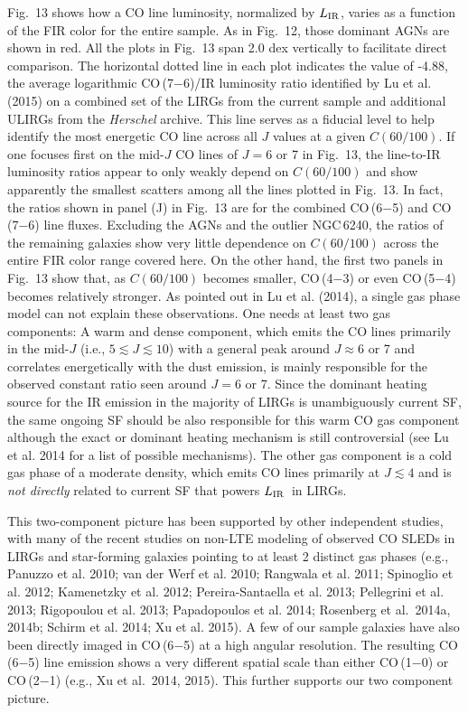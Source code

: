 \documentclass[preprint]{aastex}
\newcommand{\LIR}{\mbox{$L_{\rm IR}$}}
\begin{document}
Fig.~13 shows how a CO line luminosity, normalized by \LIR, varies as a function
of the FIR color for the entire sample. As in Fig.~12, those dominant AGNs 
are shown in red.  All the plots in Fig.~13 span 2.0 dex vertically to facilitate
direct comparison.  The horizontal dotted 
line in each plot indicates the value of -4.88, the average logarithmic 
CO\,(7$-$6)/IR luminosity ratio identified by Lu et al. (2015) on a combined set of the LIRGs 
from the current sample and additional ULIRGs from the {\it Herschel}  
archive.  This line serves as a fiducial level to help identify the most energetic
CO line across all $J$ values at a given $C(60/100)$.  If one focuses first on 
the mid-$J$ CO lines of $J = 6$ or 7 in Fig.~13, the line-to-IR luminosity ratios
appear to only weakly depend on $C(60/100)$ and show apparently the smallest 
scatters among all the lines plotted in Fig.~13.  In fact, the ratios shown in 
panel (J) in Fig.~13 are for the combined CO\,(6$-$5) and CO\,(7$-$6) line fluxes.  
Excluding the AGNs and the outlier NGC\,6240, the ratios of the remaining galaxies show 
very little dependence on $C(60/100)$ across the entire FIR color range covered
here.  On the other hand, the first two panels in Fig.~13 show that, as $C(60/100)$ 
becomes smaller, CO\,(4$-$3) or even CO\,(5$-$4) becomes relatively stronger. 
As pointed out in Lu et al. (2014), a single gas phase model can not explain 
these observations.  One needs at least two gas components: A warm and dense 
component, which emits the CO lines primarily in the mid-$J$ (i.e., $5 \lesssim J 
\lesssim 10$) with a general peak around $J \approx 6$ or 7 and correlates 
energetically with the dust emission, is mainly responsible for the observed 
constant ratio seen around $J = 6$ or 7.  Since the dominant heating source 
for the IR emission in the majority of LIRGs is unambiguously current SF, 
the same ongoing SF should be also responsible for this warm CO gas component 
although the exact or dominant heating mechanism is still controversial (see 
Lu et al. 2014 for a list of possible mechanisms).  The other gas component is
a cold gas phase of a moderate density, which emits CO lines primarily at 
$J \lesssim 4$ and is {\it not directly} related to current SF that powers \LIR\ 
in LIRGs.  


This two-component picture has been supported by other independent studies, 
with many of the recent studies on non-LTE modeling of observed CO SLEDs 
in LIRGs and star-forming galaxies pointing to at least 2 distinct gas phases 
(e.g., Panuzzo et al. 2010;  van der Werf et al. 2010;  Rangwala et al. 2011;  
Spinoglio et al. 2012; Kamenetzky et al. 2012;  Pereira-Santaella et al. 2013; 
Pellegrini et al. 2013;  Rigopoulou et al. 2013;  Papadopoulos et al. 2014; 
Rosenberg et al.~2014a, 2014b;  Schirm et al. 2014; Xu et al. 2015).  A few
of our sample galaxies have also been directly imaged in CO\,(6$-$5) at a 
high angular resolution.  The resulting CO\,(6$-$5) line emission shows a very 
different spatial scale than either CO\,(1$-$0) or CO\,(2$-$1) (e.g., Xu et 
al.~2014, 2015). This further supports our two component picture.
\end{document}
